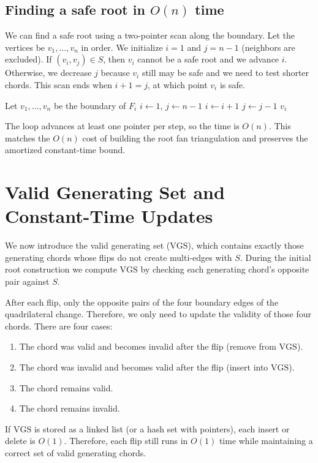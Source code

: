 \documentclass[12pt,a4paper]{report}
\theoremstyle{definition}
\theoremstyle{remark}
\newcommand{\ChordSet}{S}
\newcommand{\VGS}{\mathrm{VGS}}
\begin{document}
\section{Finding a safe root in $O(n)$ time}

We can find a safe root using a two-pointer scan along the boundary. Let the vertices be
$v_1,\ldots,v_n$ in order. We initialize $i=1$ and $j=n-1$ (neighbors are excluded). If
$(v_i,v_j)\in\ChordSet$, then $v_i$ cannot be a safe root and we advance $i$. Otherwise,
we decrease $j$ because $v_i$ still may be safe and we need to test shorter chords. This
scan ends when $i+1=j$, at which point $v_i$ is safe.

\begin{algorithm}[H]
\caption{FindSafeRoot}
\label{alg:saferoot}
\begin{algorithmic}[1]
\Procedure{FindSafeRoot}{$F_i,\ChordSet$}
    \State Let $v_1,\ldots,v_n$ be the boundary of $F_i$
    \State $i \gets 1$, $j \gets n-1$
        \If{$(v_i,v_j) \in \ChordSet$}
            \State $i \gets i+1$
        \Else
            \State $j \gets j-1$
        \EndIf
    \EndWhile
    \State \Return $v_i$
\EndProcedure
\end{algorithmic}
\end{algorithm}

The loop advances at least one pointer per step, so the time is $O(n)$. This matches the
$O(n)$ cost of building the root fan triangulation and preserves the amortized
constant-time bound.

\chapter{Valid Generating Set and Constant-Time Updates}
\label{chap:vgs}

We now introduce the valid generating set ($\VGS$), which contains exactly those
generating chords whose flips do not create multi-edges with $\ChordSet$. During the
initial root construction we compute $\VGS$ by checking each generating chord's opposite
pair against $\ChordSet$.

After each flip, only the opposite pairs of the four boundary edges of the quadrilateral
change. Therefore, we only need to update the validity of those four chords. There are
four cases:
\begin{enumerate}[leftmargin=2em]
    \item The chord was valid and becomes invalid after the flip (remove from $\VGS$).
    \item The chord was invalid and becomes valid after the flip (insert into $\VGS$).
    \item The chord remains valid.
    \item The chord remains invalid.
\end{enumerate}
If $\VGS$ is stored as a linked list (or a hash set with pointers), each insert or delete
is $O(1)$. Therefore, each flip still runs in $O(1)$ time while maintaining a correct
set of valid generating chords.
\end{document}
